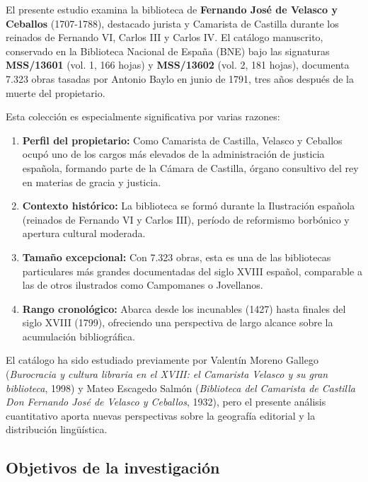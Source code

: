 \documentclass[12pt,a4paper]{article}
\begin{document}
El presente estudio examina la biblioteca de \textbf{Fernando José de Velasco y Ceballos} (1707-1788), destacado jurista y Camarista de Castilla durante los reinados de Fernando VI, Carlos III y Carlos IV. El catálogo manuscrito, conservado en la Biblioteca Nacional de España (BNE) bajo las signaturas \textbf{MSS/13601} (vol. 1, 166 hojas) y \textbf{MSS/13602} (vol. 2, 181 hojas), documenta 7.323 obras tasadas por Antonio Baylo en junio de 1791, tres años después de la muerte del propietario.

Esta colección es especialmente significativa por varias razones:

\begin{enumerate}
    \item \textbf{Perfil del propietario:} Como Camarista de Castilla, Velasco y Ceballos ocupó uno de los cargos más elevados de la administración de justicia española, formando parte de la Cámara de Castilla, órgano consultivo del rey en materias de gracia y justicia.

    \item \textbf{Contexto histórico:} La biblioteca se formó durante la Ilustración española (reinados de Fernando VI y Carlos III), período de reformismo borbónico y apertura cultural moderada.

    \item \textbf{Tamaño excepcional:} Con 7.323 obras, esta es una de las bibliotecas particulares más grandes documentadas del siglo XVIII español, comparable a las de otros ilustrados como Campomanes o Jovellanos.

    \item \textbf{Rango cronológico:} Abarca desde los incunables (1427) hasta finales del siglo XVIII (1799), ofreciendo una perspectiva de largo alcance sobre la acumulación bibliográfica.
\end{enumerate}

El catálogo ha sido estudiado previamente por Valentín Moreno Gallego (\textit{Burocracia y cultura libraria en el XVIII: el Camarista Velasco y su gran biblioteca}, 1998) y Mateo Escagedo Salmón (\textit{Biblioteca del Camarista de Castilla Don Fernando José de Velasco y Ceballos}, 1932), pero el presente análisis cuantitativo aporta nuevas perspectivas sobre la geografía editorial y la distribución lingüística.

\subsection{Objetivos de la investigación}
\end{document}
